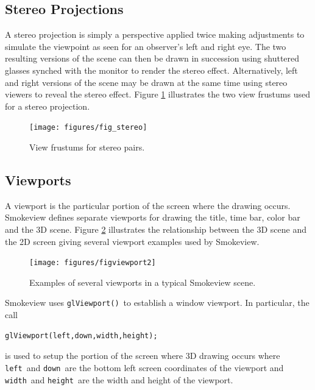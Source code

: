 \documentclass[11pt,twoside]{book}
\newcommand{\figoptions}{htp}
\begin{document}
\subsection{Stereo Projections}

A stereo projection is simply a perspective applied twice making
adjustments to simulate the viewpoint as seen for an observer's
left and right eye.  The two resulting versions of the scene can
then be drawn in succession using shuttered glasses synched with
the monitor to render the stereo effect.  Alternatively, left and
right versions of the scene may be drawn at the same time using
stereo viewers to reveal the stereo effect.  Figure
\ref{figstereo} illustrates the two view frustums used for a
stereo projection.

\begin{figure}[\figoptions]
\begin{center}
\texttt{[image: figures/fig\_stereo]}
\end{center}
\caption{View frustums for stereo pairs.}
 \label{figstereo}
\end{figure}

\subsection{Viewports}
A viewport is the particular portion of the screen where the
drawing occurs.  Smokeview defines separate viewports for drawing
the title, time bar, color bar and the 3D scene.  Figure
\ref{figviewports} illustrates the relationship between the 3D
scene and the 2D screen giving several viewport examples used by
Smokeview.
\begin{figure}[\figoptions]
\begin{center}
\texttt{[image: figures/figviewport2]}
\end{center}
\caption{Examples of several viewports in a typical Smokeview scene.}
 \label{figviewports}
\end{figure}

Smokeview uses {\tt glViewport()}\ to establish a window viewport.  In particular, the call
\begin{verbatim}
glViewport(left,down,width,height);
\end{verbatim}
is used to setup the portion of the screen where 3D drawing occurs where {\tt left}\
and {\tt down}\ are the bottom left screen coordinates of the viewport and {\tt width}\
and {\tt height}\ are the width and height of the viewport.

%
%
\end{document}
